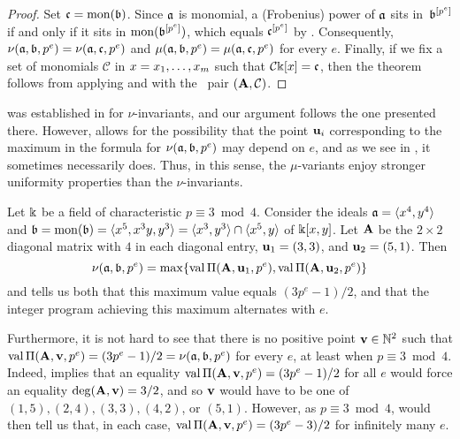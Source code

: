 \documentclass{amsart}
\begin{document}
\begin{proof} 
   Set $\mathfrak{c} = \operatorname{mon}(\mathfrak{b})$.  Since $\mathfrak{a}$ is monomial, a (Frobenius) power of $\mathfrak{a}$ sits in~$\mathfrak{b}^{[p^e]}$ if and only if it sits in $\operatorname{mon}(\mathfrak{b}^{[p^e]})$, which equals $\mathfrak{c}^{[p^e]}$ by .  Consequently, $\nu(\mathfrak{a}, \mathfrak{b}, p^e) = \nu(\mathfrak{a}, \mathfrak{c}, p^e)$ and $\mu(\mathfrak{a}, \mathfrak{b}, p^e) = \mu(\mathfrak{a}, \mathfrak{c}, p^e)$ for every $e$.  Finally, if we fix a set of monomials $\mathcal{C}$ in $x = x_1, \ldots, x_m$ such that $\mathcal{C} \Bbbk[x] = \mathfrak{c}$, then the theorem follows from applying  and  with the \compatible\ pair $(\mathbf{A}, \mathcal{C})$.
   \end{proof}

 was established in \cite[Section~4]{budur+mustata+saito.roots_bs_polys_monomial} for $\nu$-invariants, and our argument follows the one presented there.  However,  allows for the possibility that the point $\mathbf{u}_i$ corresponding to the maximum in the formula for $\nu(\mathfrak{a}, \mathfrak{b}, p^e)$ may  depend on $e$, and as we see in , it sometimes necessarily does.  Thus, in this sense, the $\mu$-variants enjoy stronger uniformity properties than the $\nu$-invariants.


\begin{example} 
\label{less uniformity for nu: E}
Let $\Bbbk$ be a field of characteristic $p \equiv 3 \bmod 4$. Consider the ideals $\mathfrak{a} = \langle x^4, y^4 \rangle$ and $\mathfrak{b} = \operatorname{mon}(\mathfrak{b}) = \langle x^5, x^3 y, y^3 \rangle = \langle x^3, y^3 \rangle \cap \langle x^5, y \rangle$ of $\Bbbk[x,y]$.  Let $\mathbf{A}$ be the $2 \times 2$ diagonal matrix with $4$ in each diagonal entry, $\mathbf{u}_1=(3,3)$, and $\mathbf{u}_2=(5,1)$.  
Then 
\[ \nu(\mathfrak{a}, \mathfrak{b}, p^e) = \max \{ \operatorname{val} \Pi(\mathbf{A},\mathbf{u}_1, p^e), \operatorname{val} \Pi(\mathbf{A}, \mathbf{u}_2, p^e) \} \] and  tells us both that this maximum value equals $(3p^e-1)/2$, and that the integer program achieving this maximum alternates with $e$.

Furthermore, it is not hard to see that there is no positive point $\mathbf{v} \in \mathbb{N}^2$ such that $\operatorname{val} \Pi(\mathbf{A}, \mathbf{v}, p^e) = (3p^e-1)/2 = \nu(\mathfrak{a}, \mathfrak{b}, p^e)$ for every $e$, at least when $p \equiv 3 \bmod 4$.  Indeed,  implies that an equality $\operatorname{val} \Pi(\mathbf{A}, \mathbf{v}, p^e) = (3p^e-1)/2$ for all $e$ would force an equality $\operatorname{deg}(\mathbf{A},\mathbf{v}) = 3/2$, and so $\mathbf{v}$ would have to be one of $(1,5), (2,4), (3,3), (4,2)$, or $(5,1)$.  However, as $p \equiv 3 \bmod 4$,     would then tell us that, in each case, $\operatorname{val} \Pi(\mathbf{A}, \mathbf{v}, p^e) = (3p^e-3)/2$ for infinitely many $e$.
\end{example}
\end{document}
